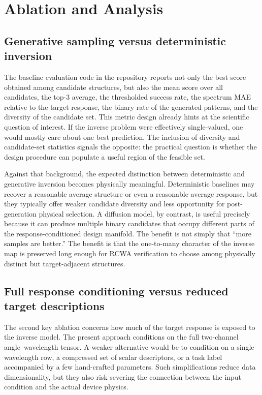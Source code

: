 \section{Ablation and Analysis}

\subsection{Generative sampling versus deterministic inversion}

The baseline evaluation code in the repository reports not only the best score obtained among candidate structures, but also the mean score over all candidates, the top-3 average, the thresholded success rate, the spectrum MAE relative to the target response, the binary rate of the generated patterns, and the diversity of the candidate set. This metric design already hints at the scientific question of interest. If the inverse problem were effectively single-valued, one would mostly care about one best prediction. The inclusion of diversity and candidate-set statistics signals the opposite: the practical question is whether the design procedure can populate a useful region of the feasible set.

Against that background, the expected distinction between deterministic and generative inversion becomes physically meaningful. Deterministic baselines may recover a reasonable average structure or even a reasonable average response, but they typically offer weaker candidate diversity and less opportunity for post-generation physical selection. A diffusion model, by contrast, is useful precisely because it can produce multiple binary candidates that occupy different parts of the response-conditioned design manifold. The benefit is not simply that ``more samples are better.'' The benefit is that the one-to-many character of the inverse map is preserved long enough for RCWA verification to choose among physically distinct but target-adjacent structures.

\subsection{Full response conditioning versus reduced target descriptions}

The second key ablation concerns how much of the target response is exposed to the inverse model. The present approach conditions on the full two-channel angle--wavelength tensor. A weaker alternative would be to condition on a single wavelength row, a compressed set of scalar descriptors, or a task label accompanied by a few hand-crafted parameters. Such simplifications reduce data dimensionality, but they also risk severing the connection between the input condition and the actual device physics.

